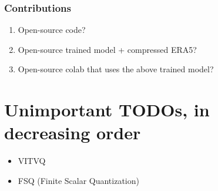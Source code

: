 \subsubsection{Contributions}
\begin{enumerate}
    \item Open-source code?
    \item Open-source trained model + compressed ERA5?
    \item Open-source colab that uses the above trained model?
\end{enumerate}


\section{Unimportant TODOs, in decreasing order}
\begin{itemize}
    \item VITVQ
    \item FSQ (Finite Scalar Quantization)
\end{itemize}